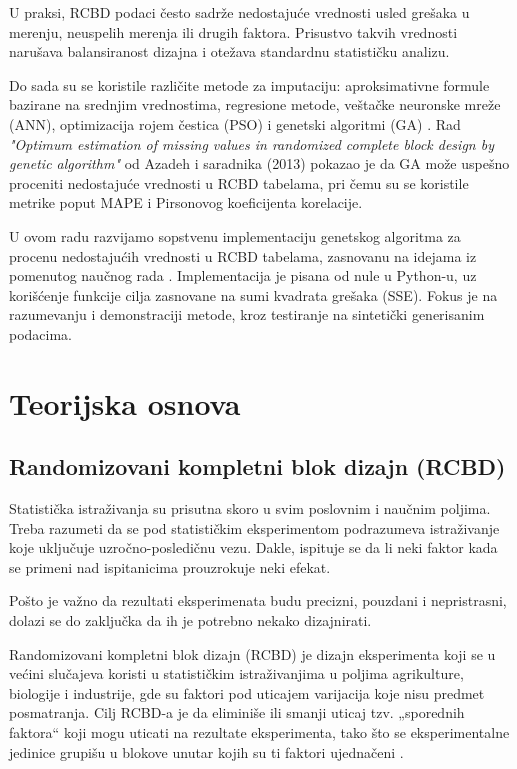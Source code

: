 \documentclass[a4paper,12pt]{article}
\begin{document}
U praksi, RCBD podaci često sadrže nedostajuće vrednosti usled grešaka u merenju, neuspelih merenja ili drugih faktora. Prisustvo takvih vrednosti narušava balansiranost dizajna i otežava standardnu statističku analizu.

Do sada su se koristile različite metode za imputaciju: aproksimativne formule bazirane na srednjim vrednostima, regresione metode, veštačke neuronske mreže (ANN), optimizacija rojem čestica (PSO) i genetski algoritmi (GA) \cite{azadeh2013}. Rad \textit{"Optimum estimation of missing values in randomized complete block design by genetic algorithm"} od Azadeh i saradnika (2013) pokazao je da GA može uspešno proceniti nedostajuće vrednosti u RCBD tabelama, pri čemu su se koristile metrike poput MAPE i Pirsonovog koeficijenta korelacije.

U ovom radu razvijamo sopstvenu implementaciju genetskog algoritma za procenu nedostajućih vrednosti u RCBD tabelama, zasnovanu na idejama iz pomenutog naučnog rada \cite{azadeh2013}. Implementacija je pisana od nule u Python-u, uz korišćenje funkcije cilja zasnovane na sumi kvadrata grešaka (SSE). Fokus je na razumevanju i demonstraciji metode, kroz testiranje na sintetički generisanim podacima.


\newpage
\section{Teorijska osnova}
\subsection{Randomizovani kompletni blok dizajn (RCBD)}

Statistička istraživanja su prisutna skoro u svim poslovnim i naučnim poljima. Treba razumeti da se pod statističkim eksperimentom podrazumeva istraživanje koje uključuje uzročno-posledičnu vezu. Dakle, ispituje se da li neki faktor kada se primeni nad ispitanicima prouzrokuje neki efekat.

Pošto je važno da rezultati eksperimenata budu precizni, pouzdani i nepristrasni, dolazi se do zaključka da ih je potrebno nekako dizajnirati.

Randomizovani kompletni blok dizajn (RCBD) je dizajn eksperimenta koji se u većini slučajeva koristi u statističkim istraživanjima u poljima agrikulture, biologije i industrije, gde su faktori pod uticajem varijacija koje nisu predmet posmatranja. Cilj RCBD-a je da eliminiše ili smanji uticaj tzv. „sporednih faktora“ koji mogu uticati na rezultate eksperimenta, tako što se eksperimentalne jedinice grupišu u blokove unutar kojih su ti faktori ujednačeni \cite{gomez1984}.
\end{document}
